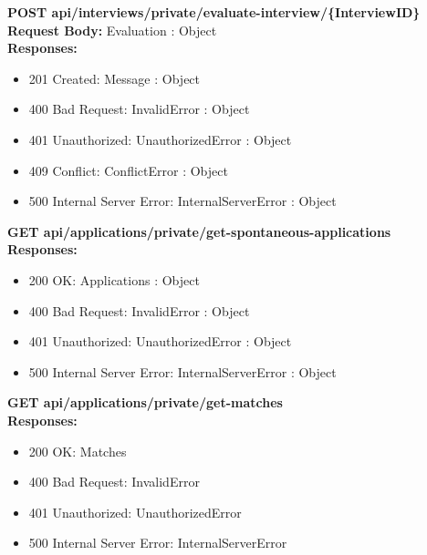 \noindent\textbf{\color{titleColor}POST api/interviews/private/evaluate-interview/\{InterviewID\}}
\vspace{2pt}
\\\textbf{\color{titleColor}Request Body:} Evaluation : Object 
\vspace{4pt}
\\\textbf{\color{titleColor}Responses:} 
\begin{itemize}
    \item {\color{titleColor}201 Created:} Message : Object
    \item {\color{titleColor}400 Bad Request:} InvalidError : Object
    \item {\color{titleColor}401 Unauthorized:} UnauthorizedError : Object
    \item {\color{titleColor}409 Conflict:} ConflictError : Object
    \item {\color{titleColor}500 Internal Server Error:} InternalServerError : Object
\end{itemize}
\vspace{10pt}
\noindent{\color{titleColor}\rule{0.8\linewidth}{0.2mm}}
\vspace{10pt}

\noindent\textbf{\color{titleColor}GET api/applications/private/get-spontaneous-applications}
\vspace{2pt}
\\\textbf{\color{titleColor}Responses:} 
\begin{itemize}
    \item {\color{titleColor}200 OK:} Applications : Object
    \item {\color{titleColor}400 Bad Request:} InvalidError : Object
    \item {\color{titleColor}401 Unauthorized:} UnauthorizedError : Object
    \item {\color{titleColor}500 Internal Server Error:} InternalServerError : Object
\end{itemize}
\vspace{10pt}
\noindent{\color{titleColor}\rule{0.8\linewidth}{0.2mm}}
\vspace{10pt}

\noindent\textbf{\color{titleColor}GET api/applications/private/get-matches}
\vspace{2pt}
\\\textbf{\color{titleColor}Responses:} 
\begin{itemize}
    \item {\color{titleColor}200 OK:} Matches
    \item {\color{titleColor}400 Bad Request:} InvalidError
    \item {\color{titleColor}401 Unauthorized:} UnauthorizedError
    \item {\color{titleColor}500 Internal Server Error:} InternalServerError
\end{itemize}
\vspace{10pt}
\noindent{\color{titleColor}\rule{0.8\linewidth}{0.2mm}}
\vspace{10pt}

